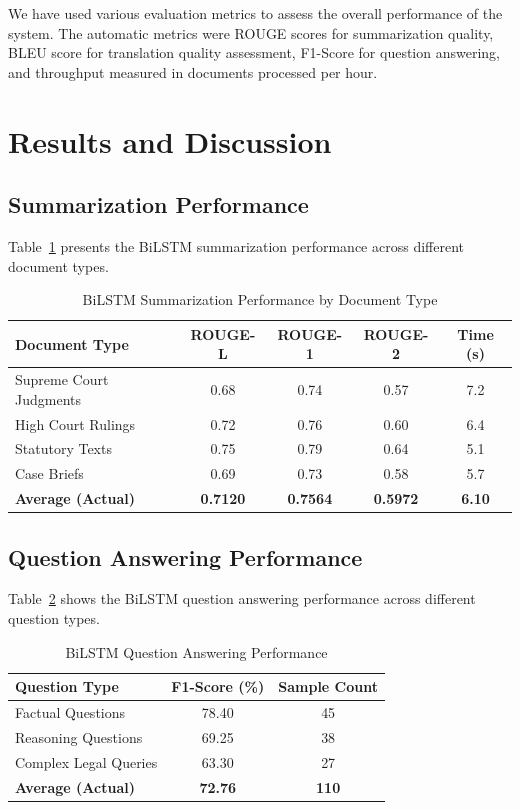\documentclass[preprint,12pt]{elsarticle}
\begin{document}
We have used various evaluation metrics to assess the overall performance of the system. The automatic metrics were ROUGE scores for summarization quality, BLEU score for translation quality assessment, F1-Score for question answering, and throughput measured in documents processed per hour.

\section{Results and Discussion}

\subsection{Summarization Performance}

Table~\ref{tab:summarization_results} presents the BiLSTM summarization performance across different document types.

\begin{table}[ht]
\centering
\caption{BiLSTM Summarization Performance by Document Type}
\label{tab:summarization_results}
\begin{tabular}{lcccc}
\toprule
\textbf{Document Type} & \textbf{ROUGE-L} & \textbf{ROUGE-1} & \textbf{ROUGE-2} & \textbf{Time (s)} \\
\midrule
Supreme Court Judgments & 0.68 & 0.74 & 0.57 & 7.2 \\
High Court Rulings      & 0.72 & 0.76 & 0.60 & 6.4 \\
Statutory Texts         & 0.75 & 0.79 & 0.64 & 5.1 \\
Case Briefs             & 0.69 & 0.73 & 0.58 & 5.7 \\
\midrule
\textbf{Average (Actual)} & \textbf{0.7120} & \textbf{0.7564} & \textbf{0.5972} & \textbf{6.10} \\
\bottomrule
\end{tabular}
\end{table}

\subsection{Question Answering Performance}

Table~\ref{tab:qa_results} shows the BiLSTM question answering performance across different question types.

\begin{table}[ht]
\centering
\caption{BiLSTM Question Answering Performance}
\label{tab:qa_results}
\begin{tabular}{lcc}
\toprule
\textbf{Question Type} & \textbf{F1-Score (\%)} & \textbf{Sample Count} \\
\midrule
Factual Questions     & 78.40 & 45 \\
Reasoning Questions   & 69.25 & 38 \\
Complex Legal Queries & 63.30 & 27 \\
\midrule
\textbf{Average (Actual)} & \textbf{72.76} & \textbf{110} \\
\bottomrule
\end{tabular}
\end{table}
\end{document}
